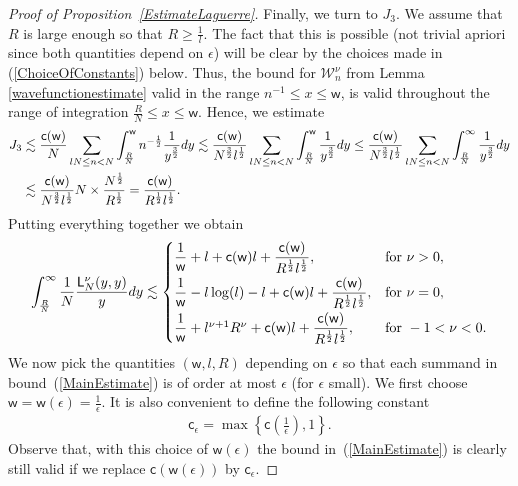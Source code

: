 \documentclass[11pt]{article}
\numberwithin{equation}{section}
\begin{document}
\begin{proof}[Proof of Proposition~\ref{EstimateLaguerre}]
Finally, we turn to $J_3$. We assume that $R$ is large enough so that $R \ge \frac{1}{l}$. The fact that this is possible (not trivial apriori since both quantities depend on $\epsilon$) will be clear by the choices made in (\ref{ChoiceOfConstants}) below. Thus, the bound for $\mathcal{W}_n^{\nu}$ from Lemma \ref{wavefunctionestimate} valid in the range $n^{-1}\le x \le \mathsf{w}$, is valid throughout the range of integration $\frac{R}{N} \le x \le \mathsf{w}$. Hence, we estimate
\begin{align*}
J_3 &\lesssim \frac{\mathsf{c}(\mathsf{w})}{N} \sum_{lN \le n < N}^{}\int_{\frac{R}{N}}^{\mathsf{w}}n^{-\frac{1}{2}}\frac{1}{y^{\frac{3}{2}}}{\rm d}y\lesssim \frac{\mathsf{c}(\mathsf{w})}{N^{\frac{3}{2}}l^{\frac{1}{2}}} \sum_{lN \le n < N}^{}\int_{\frac{R}{N}}^{\mathsf{w}}\frac{1}{y^{\frac{3}{2}}}{\rm d}y\le \frac{\mathsf{c}(\mathsf{w})}{N^{\frac{3}{2}}l^{\frac{1}{2}}} \sum_{lN \le n < N}^{}\int_{\frac{R}{N}}^{\infty}\frac{1}{y^{\frac{3}{2}}}{\rm d}y \nonumber\\
&\lesssim \frac{\mathsf{c}(\mathsf{w})}{N^{\frac{3}{2}}l^{\frac{1}{2}}} N \times \frac{N^{\frac{1}{2}}}{R^{\frac{1}{2}}}=\frac{\mathsf{c}(\mathsf{w})}{R^{\frac{1}{2}}l^{\frac{1}{2}}}.
\end{align*}
Putting everything together we obtain
\begin{gather}\label{MainEstimate}
\int_{\frac{R}{N}}^{\infty}\frac{1}{N}\frac{\mathsf{L}_N^{\nu}(y,y)}{y}{\rm d}y \lesssim \begin{cases}
\dfrac{1}{\mathsf{w}}+l+\mathsf{c}(\mathsf{w})l+\dfrac{\mathsf{c}(\mathsf{w})}{R^{\frac{1}{2}}l^{\frac{1}{2}}}, &\text{for } \nu>0,\vspace{1mm}\\
\dfrac{1}{\mathsf{w}}-l\log(l)-l+\mathsf{c}(\mathsf{w})l+\dfrac{\mathsf{c}(\mathsf{w})}{R^{\frac{1}{2}}l^{\frac{1}{2}}}, &\text{for } \nu=0,\vspace{1mm}\\
\dfrac{1}{\mathsf{w}}+l^{\nu+1}R^{\nu}+\mathsf{c}(\mathsf{w})l+\dfrac{\mathsf{c}(\mathsf{w})}{R^{\frac{1}{2}}l^{\frac{1}{2}}}, &\text{for } -1<\nu<0.
\end{cases}
\end{gather}
We now pick the quantities $(\mathsf{w},l,R)$ depending on $\epsilon$ so that each summand in bound~(\ref{MainEstimate}) is of order at most $\epsilon$ (for $\epsilon$ small). We first choose $\mathsf{w}=\mathsf{w}(\epsilon)=\frac{1}{\epsilon}$. It is also convenient to define the following constant
 \begin{gather*}
\mathsf{c}_{\epsilon}=\max \left\{\mathsf{c}\left(\frac{1}{\epsilon}\right),1 \right\}.
 \end{gather*}
Observe that, with this choice of $\mathsf{w}(\epsilon)$ the bound in~(\ref{MainEstimate}) is clearly still valid if we replace $\mathsf{c}(\mathsf{w}(\epsilon))$ by $\mathsf{c}_{\epsilon}$.


\end{proof}
\end{document}
